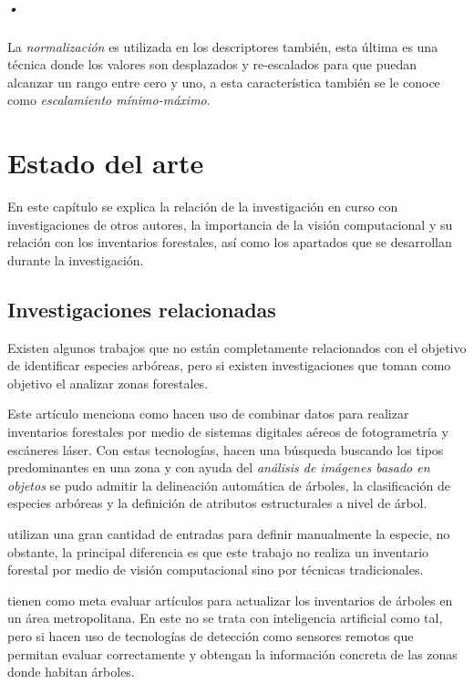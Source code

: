 \paragraph{•} La \emph{normalización} es utilizada en los descriptores también, esta última es una técnica donde los valores son desplazados y re-escalados  para que puedan alcanzar un rango entre cero y uno, a esta característica también se le conoce como \emph{escalamiento mínimo-máximo}.

\chapter{Estado del arte}
En este capítulo se explica la relación de la investigación en curso con investigaciones de otros autores, la importancia de la visión computacional y su relación con los inventarios forestales, así como los apartados que se desarrollan durante la investigación.

\section{Investigaciones relacionadas}
Existen algunos trabajos que no están completamente relacionados con el objetivo de identificar especies arbóreas, pero si existen investigaciones que toman como objetivo el analizar zonas forestales.

\citet{rf14} Este artículo menciona como hacen uso de combinar datos para realizar inventarios forestales por medio de sistemas digitales aéreos de fotogrametría y escáneres láser. Con estas tecnologías, hacen una búsqueda buscando los tipos predominantes en una zona y con ayuda del \emph{análisis de imágenes basado en objetos} se pudo admitir la delineación automática de árboles, la clasificación de especies arbóreas y la definición de atributos estructurales a nivel de árbol. 
\newline
\break

\citet{rf1}  utilizan una gran cantidad de entradas para definir manualmente la especie, no obstante, la principal diferencia es que este trabajo no realiza un inventario forestal por medio de visión computacional sino por técnicas tradicionales.
 
\citet{rf2} tienen como meta evaluar artículos para actualizar los inventarios de árboles en un área metropolitana. En este no se trata con inteligencia artificial como tal, pero si hacen uso de tecnologías de detección como sensores remotos que permitan evaluar correctamente y obtengan la información concreta de las zonas donde habitan  árboles.

